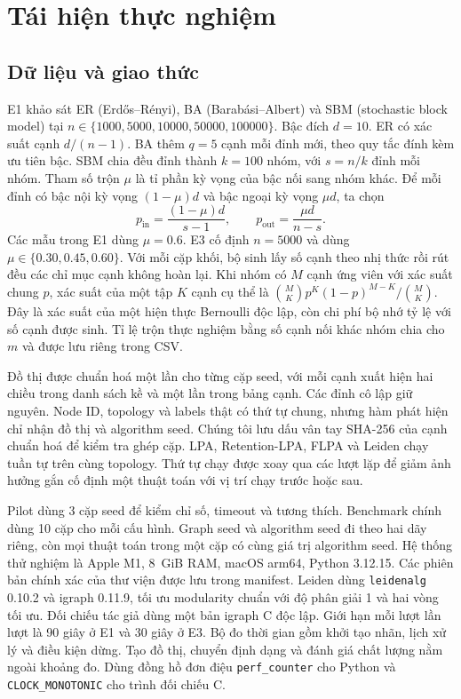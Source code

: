 \section{Tái hiện thực nghiệm}
\label{sec:experiments}

\subsection{Dữ liệu và giao thức}
E1 khảo sát ER (Erdős–Rényi), BA (Barabási–Albert) và SBM (stochastic block model) tại $n\in\{1000,5000,10000,50000,100000\}$. Bậc đích $d=10$. ER có xác suất cạnh $d/(n-1)$. BA thêm $q=5$ cạnh mỗi đỉnh mới, theo quy tắc đính kèm ưu tiên bậc. SBM chia đều đỉnh thành $k=100$ nhóm, với $s=n/k$ đỉnh mỗi nhóm. Tham số trộn $\mu$ là tỉ phần kỳ vọng của bậc nối sang nhóm khác. Để mỗi đỉnh có bậc nội kỳ vọng $(1-\mu)d$ và bậc ngoại kỳ vọng $\mu d$, ta chọn
\begin{equation}
 p_{\mathrm{in}}=\frac{(1-\mu)d}{s-1},\qquad
 p_{\mathrm{out}}=\frac{\mu d}{n-s}.
 \label{eq:sbm}
\end{equation}
Các mẫu trong E1 dùng $\mu=0.6$. E3 cố định $n=5000$ và dùng $\mu\in\{0.30,0.45,0.60\}$. Với mỗi cặp khối, bộ sinh lấy số cạnh theo nhị thức rồi rút đều các chỉ mục cạnh không hoàn lại. Khi nhóm có $M$ cạnh ứng viên với xác suất chung $p$, xác suất của một tập $K$ cạnh cụ thể là ${M\choose K}p^K(1-p)^{M-K}/{M\choose K}$. Đây là xác suất của một hiện thực Bernoulli độc lập, còn chi phí bộ nhớ tỷ lệ với số cạnh được sinh. Tỉ lệ trộn thực nghiệm bằng số cạnh nối khác nhóm chia cho $m$ và được lưu riêng trong CSV.

Đồ thị được chuẩn hoá một lần cho từng cặp seed, với mỗi cạnh xuất hiện hai chiều trong danh sách kề và một lần trong bảng cạnh. Các đỉnh cô lập giữ nguyên. Node ID, topology và labels thật có thứ tự chung, nhưng hàm phát hiện chỉ nhận đồ thị và algorithm seed. Chúng tôi lưu dấu vân tay SHA-256 của cạnh chuẩn hoá để kiểm tra ghép cặp. LPA, Retention-LPA, FLPA và Leiden chạy tuần tự trên cùng topology. Thứ tự chạy được xoay qua các lượt lặp để giảm ảnh hưởng gắn cố định một thuật toán với vị trí chạy trước hoặc sau.

Pilot dùng 3 cặp seed để kiểm chỉ số, timeout và tương thích. Benchmark chính dùng 10 cặp cho mỗi cấu hình. Graph seed và algorithm seed đi theo hai dãy riêng, còn mọi thuật toán trong một cặp có cùng giá trị algorithm seed. Hệ thống thử nghiệm là Apple M1, 8~GiB RAM, macOS arm64, Python 3.12.15. Các phiên bản chính xác của thư viện được lưu trong manifest. Leiden dùng \texttt{leidenalg} 0.10.2 và igraph 0.11.9, tối ưu modularity chuẩn với độ phân giải 1 và hai vòng tối ưu. Đối chiếu tác giả dùng một bản igraph C độc lập. Giới hạn mỗi lượt lần lượt là 90 giây ở E1 và 30 giây ở E3. Bộ đo thời gian gồm khởi tạo nhãn, lịch xử lý và điều kiện dừng. Tạo đồ thị, chuyển định dạng và đánh giá chất lượng nằm ngoài khoảng đo. Dùng đồng hồ đơn điệu \texttt{perf\_counter} cho Python và \texttt{CLOCK\_MONOTONIC} cho trình đối chiếu C.


